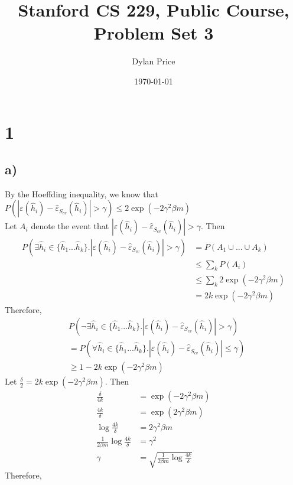 \documentclass[11pt]{article}
\begin{document}
\title{Stanford CS 229, Public Course, Problem Set 3}
\date{\today}
\author{Dylan Price}
\maketitle 

\newcommand{\hhat}[1][]{\hat{h}_#1}
\newcommand{\CvtError}[0]{\hat{\varepsilon}_{S_{cv}}}
\newcommand{\GError}[0]{\varepsilon}
\newcommand{\pder}[2]{\frac{\partial#1}{\partial#2}}

\section*{1}

\subsection*{a)}
By the Hoeffding inequality, we know that \\

$P(|\GError(\hhat{i}) - \CvtError(\hhat{i})| > \gamma) \le 2\exp(-2 \gamma^2 \beta m) $ \\

Let $A_i$ denote the event that $|\GError(\hhat{i}) - \CvtError(\hhat{i})| > \gamma$. Then \\
\begin{align*}
    P(\exists \hhat{i} \in \{\hhat{1}...\hhat{k}\}. |\GError(\hhat{i}) - \CvtError(\hhat{i})| > \gamma) 
        &= P(A_1 \cup ... \cup A_k) \\
        &\le \sum_k P(A_i) \\
        &\le \sum_k 2\exp(-2 \gamma^2 \beta m) \\
        &= 2k \exp(-2 \gamma^2 \beta m)
\end{align*}
Therefore, \begin{align*}
    &P(\neg \exists \hhat{i} \in \{\hhat{1}...\hhat{k}\}. |\GError(\hhat{i}) - \CvtError(\hhat{i})| > \gamma) \\
    &= P(\forall \hhat{i} \in \{\hhat{1}...\hhat{k}\}. |\GError(\hhat{i}) - \CvtError(\hhat{i})| \le \gamma) \\
    &\geq 1 - 2k\exp(-2 \gamma^2 \beta m)
\end{align*}
Let $\frac{\delta}{2} = 2k\exp(-2 \gamma^2 \beta m)$. Then
\begin{align*}
                          \frac{\delta}{4k} &= \exp(-2 \gamma^2 \beta m) \\
                          \frac{4k}{\delta} &= \exp(2 \gamma^2 \beta m) \\
                     \log \frac{4k}{\delta} &= 2 \gamma^2 \beta m \\
 \frac{1}{2 \beta m} \log \frac{4k}{\delta} &= \gamma^2 \\
                                     \gamma &= \sqrt{\frac{1}{2 \beta m} \log \frac{4k}{\delta}}
\end{align*}
Therefore,
\end{document}
